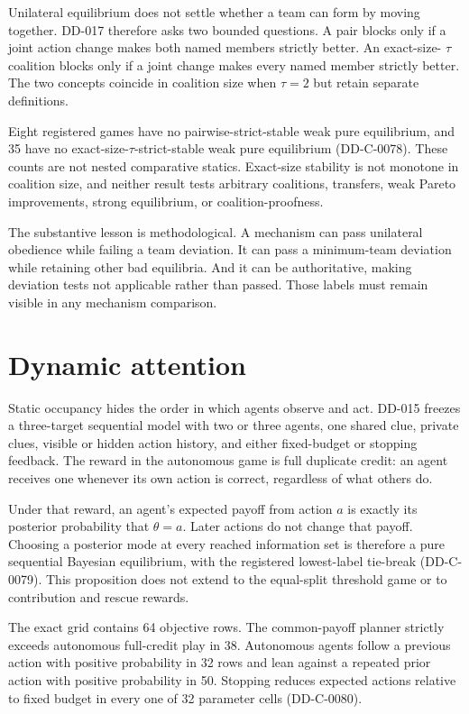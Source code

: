 \documentclass[11pt]{article}
\begin{document}
Unilateral equilibrium does not settle whether a team can form by moving
together. DD-017 therefore asks two bounded questions. A pair blocks only if a
joint action change makes both named members strictly better. An exact-size-
$\tau$ coalition blocks only if a joint change makes every named member
strictly better. The two concepts coincide in coalition size when $\tau=2$ but
retain separate definitions.

Eight registered games have no pairwise-strict-stable weak pure equilibrium,
and 35 have no exact-size-$\tau$-strict-stable weak pure equilibrium
(DD-C-0078). These counts are not nested comparative statics. Exact-size
stability is not monotone in coalition size, and neither result tests arbitrary
coalitions, transfers, weak Pareto improvements, strong equilibrium, or
coalition-proofness.

The substantive lesson is methodological. A mechanism can pass unilateral
obedience while failing a team deviation. It can pass a minimum-team deviation
while retaining other bad equilibria. And it can be authoritative, making
deviation tests not applicable rather than passed. Those labels must remain
visible in any mechanism comparison.

\section{Dynamic attention}

Static occupancy hides the order in which agents observe and act. DD-015
freezes a three-target sequential model with two or three agents, one shared
clue, private clues, visible or hidden action history, and either fixed-budget
or stopping feedback. The reward in the autonomous game is full duplicate
credit: an agent receives one whenever its own action is correct, regardless of
what others do.

Under that reward, an agent's expected payoff from action $a$ is exactly its
posterior probability that $\theta=a$. Later actions do not change that payoff.
Choosing a posterior mode at every reached information set is therefore a pure
sequential Bayesian equilibrium, with the registered lowest-label tie-break
(DD-C-0079). This proposition does not extend to the equal-split threshold game
or to contribution and rescue rewards.

The exact grid contains 64 objective rows. The common-payoff planner strictly
exceeds autonomous full-credit play in 38. Autonomous agents follow a previous
action with positive probability in 32 rows and lean against a repeated prior
action with positive probability in 50. Stopping reduces expected actions
relative to fixed budget in every one of 32 parameter cells (DD-C-0080).
\end{document}
